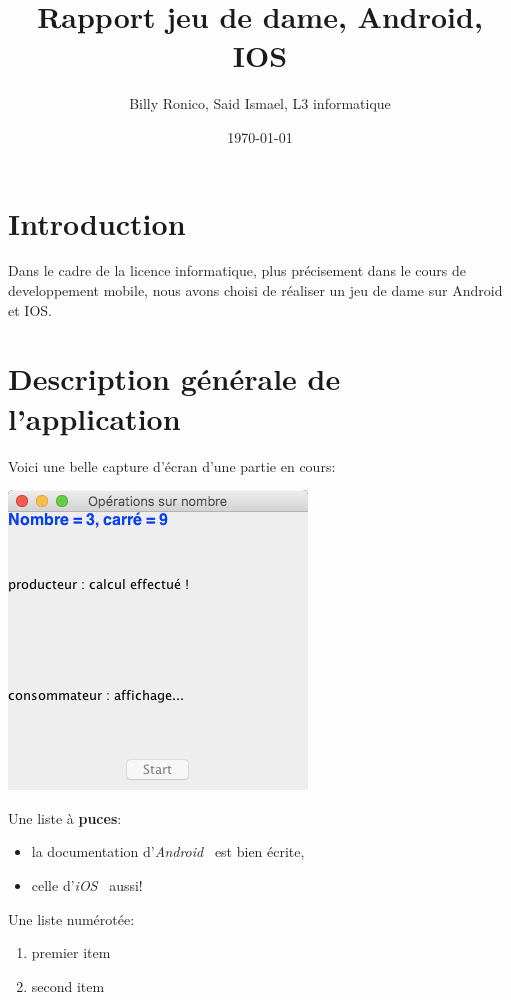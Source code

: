 \documentclass{article}
\title{Rapport jeu de dame, Android, IOS}
\author{Billy Ronico, Said Ismael, L3 informatique}rm
\date{\today}
\begin{document}
\maketitle %


\section{Introduction}
\label{section:intro} %

Dans le cadre de la licence informatique, plus précisement dans le cours de developpement 
mobile, nous avons choisi de réaliser un jeu de dame sur Android et IOS.

\section{Description générale de l'application}

Voici une belle capture d'écran d'une partie en cours:

\begin{center}
  \includegraphics[scale=0.5]{exo3_1_1.png}
\end{center}

Une liste à \textbf{puces}:
\begin{itemize}
\item la documentation d'\textit{Android}~\cite{androidDoc}
  est bien écrite,
\item celle d'\textit{iOS}~\cite{iosDoc} aussi!
\end{itemize}


Une liste numérotée:
\begin{enumerate}
\item premier item
\item second item
\end{enumerate}
\end{document}
